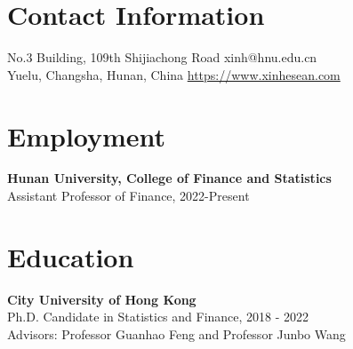 \documentclass[margin]{res}
\begin{document}
\begin{resume}




\section{\sc Contact Information}
	No.3 Building, 109th Shijiachong Road	   \hfill xinh@hnu.edu.cn\\        
	Yuelu, Changsha, Hunan, China 	\hfill   \url{https://www.xinhesean.com} \\

\vspace{5mm}

\section{\sc Employment}
\textbf{Hunan University, College of Finance and Statistics}\\
{Assistant Professor of Finance, 2022-Present}\\

\vspace{5mm}

\section{\sc Education}
\textbf{City University of Hong Kong}\\
{Ph.D. Candidate in Statistics and Finance, 2018 - 2022}\\
Advisors: Professor Guanhao Feng and Professor Junbo Wang


\end{resume}
\end{document}
